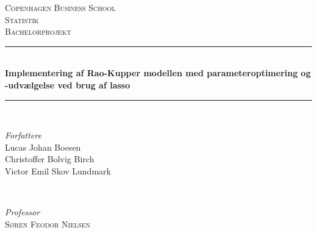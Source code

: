 \documentclass[11pt,a4paper]{article}
\begin{document}
\begin{titlepage} %
	\newcommand{\HRule}{\rule{\linewidth}{0.5mm}} %
	
	\center %
	
	
	\textsc{\LARGE Copenhagen Business School}\\[1.5cm] %
	
	\textsc{\Large Statistik}\\[0.5cm] %
	
	\textsc{\large Bachelorprojekt}\\[0.5cm] %
	
	
	\HRule\\[0.4cm]
	
	{\huge\bfseries Implementering af Rao-Kupper modellen med parameteroptimering og -udvælgelse ved brug af lasso}\\[0.4cm] %
	
	\HRule\\[1.5cm]
	
	
	\begin{minipage}{0.4\textwidth}
		\begin{flushleft}
			\large
			\textit{Forfattere}\\
			Lucas Johan Boesen\\ %
			Christoffer Bolvig Birch\\ %
			Victor Emil Skov Lundmark\\ %
		\end{flushleft}
	\end{minipage}
	~
	\begin{minipage}{0.4\textwidth}
		\begin{flushright}
			\large
			\textit{Professor}\\
			\textsc{Søren Feodor Nielsen}\\
			\textsc{}\\
			\textsc{}\\%
		\end{flushright}
	\end{minipage}
	

\end{titlepage}
\end{document}
